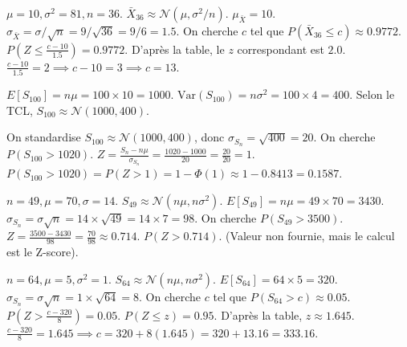 \begin{correctionbox}
$\mu=10, \sigma^2=81, n=36$. $\bar{X}_{36} \approx \mathcal{N}(\mu, \sigma^2/n)$.
$\mu_{\bar{X}} = 10$. $\sigma_{\bar{X}} = \sigma / \sqrt{n} = 9 / \sqrt{36} = 9 / 6 = 1.5$.
On cherche $c$ tel que $P(\bar{X}_{36} \le c) \approx 0.9772$.
$P(Z \le \frac{c - 10}{1.5}) = 0.9772$.
D'après la table, le $z$ correspondant est $2.0$.
$\frac{c - 10}{1.5} = 2 \implies c - 10 = 3 \implies c = 13$.
\end{correctionbox}

\begin{correctionbox}
$E[S_{100}] = n\mu = 100 \times 10 = 1000$.
$\text{Var}(S_{100}) = n\sigma^2 = 100 \times 4 = 400$.
Selon le TCL, $S_{100} \approx \mathcal{N}(1000, 400)$.
\end{correctionbox}

\begin{correctionbox}
On standardise $S_{100} \approx \mathcal{N}(1000, 400)$, donc $\sigma_{S_n} = \sqrt{400} = 20$.
On cherche $P(S_{100} > 1020)$.
$Z = \frac{S_n - n\mu}{\sigma_{S_n}} = \frac{1020 - 1000}{20} = \frac{20}{20} = 1$.
$P(S_{100} > 1020) = P(Z > 1) = 1 - \Phi(1) \approx 1 - 0.8413 = 0.1587$.
\end{correctionbox}

\begin{correctionbox}
$n=49, \mu=70, \sigma=14$. $S_{49} \approx \mathcal{N}(n\mu, n\sigma^2)$.
$E[S_{49}] = n\mu = 49 \times 70 = 3430$.
$\sigma_{S_n} = \sigma \sqrt{n} = 14 \times \sqrt{49} = 14 \times 7 = 98$.
On cherche $P(S_{49} > 3500)$.
$Z = \frac{3500 - 3430}{98} = \frac{70}{98} \approx 0.714$.
$P(Z > 0.714)$. (Valeur non fournie, mais le calcul est le Z-score).
\end{correctionbox}

\begin{correctionbox}
$n=64, \mu=5, \sigma^2=1$. $S_{64} \approx \mathcal{N}(n\mu, n\sigma^2)$.
$E[S_{64}] = 64 \times 5 = 320$.
$\sigma_{S_n} = \sigma \sqrt{n} = 1 \times \sqrt{64} = 8$.
On cherche $c$ tel que $P(S_{64} > c) \approx 0.05$.
$P(Z > \frac{c - 320}{8}) = 0.05$.
$P(Z \le z) = 0.95$. D'après la table, $z \approx 1.645$.
$\frac{c - 320}{8} = 1.645 \implies c = 320 + 8(1.645) = 320 + 13.16 = 333.16$.
\end{correctionbox}

